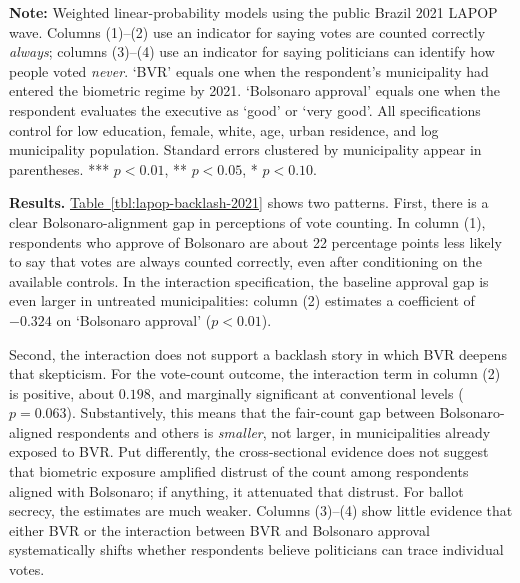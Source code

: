 \begin{table}[ht]
    \caption{Backlash and electoral-integrity regressions, LAPOP Brazil 2021}
    \label{tbl:lapop-backlash-2021}
    
    \begin{minipage}{\textwidth}
        {\footnotesize \textbf{Note:} Weighted linear-probability models using the public Brazil 2021 LAPOP wave. Columns (1)--(2) use an indicator for saying votes are counted correctly \emph{always}; columns (3)--(4) use an indicator for saying politicians can identify how people voted \emph{never}. `BVR' equals one when the respondent's municipality had entered the biometric regime by 2021. `Bolsonaro approval' equals one when the respondent evaluates the executive as `good' or `very good'. All specifications control for low education, female, white, age, urban residence, and log municipality population. Standard errors clustered by municipality appear in parentheses. *** $p<0.01$, ** $p<0.05$, * $p<0.10$.
        \par}
    \end{minipage}
\end{table}

\textbf{Results.} \hyperref[tbl:lapop-backlash-2021]{Table~\ref*{tbl:lapop-backlash-2021}} shows two patterns. First, there is a clear Bolsonaro-alignment gap in perceptions of vote counting. In column (1), respondents who approve of Bolsonaro are about 22 percentage points less likely to say that votes are always counted correctly, even after conditioning on the available controls. In the interaction specification, the baseline approval gap is even larger in untreated municipalities: column (2) estimates a coefficient of $-0.324$ on `Bolsonaro approval' ($p<0.01$).

Second, the interaction does not support a backlash story in which BVR deepens that skepticism. For the vote-count outcome, the interaction term in column (2) is positive, about $0.198$, and marginally significant at conventional levels ($p=0.063$). Substantively, this means that the fair-count gap between Bolsonaro-aligned respondents and others is \emph{smaller}, not larger, in municipalities already exposed to BVR. Put differently, the cross-sectional evidence does not suggest that biometric exposure amplified distrust of the count among respondents aligned with Bolsonaro; if anything, it attenuated that distrust. For ballot secrecy, the estimates are much weaker. Columns (3)--(4) show little evidence that either BVR or the interaction between BVR and Bolsonaro approval systematically shifts whether respondents believe politicians can trace individual votes.

